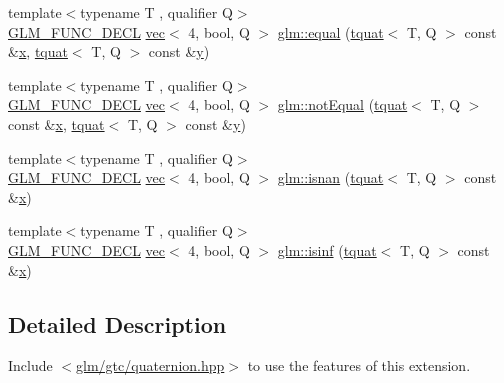 \begin{DoxyCompactItemize}
\item 
{\footnotesize template$<$typename T , qualifier Q$>$ }\\\mbox{\hyperlink{setup_8hpp_ab2d052de21a70539923e9bcbf6e83a51}{G\+L\+M\+\_\+\+F\+U\+N\+C\+\_\+\+D\+E\+CL}} \mbox{\hyperlink{structglm_1_1vec}{vec}}$<$ 4, bool, Q $>$ \mbox{\hyperlink{group__gtc__quaternion_ga22089a76bfb7b45b4c34961bb715e2df}{glm\+::equal}} (\mbox{\hyperlink{structglm_1_1tquat}{tquat}}$<$ T, Q $>$ const \&\mbox{\hyperlink{_s_d_l__opengl_8h_ad0e63d0edcdbd3d79554076bf309fd47}{x}}, \mbox{\hyperlink{structglm_1_1tquat}{tquat}}$<$ T, Q $>$ const \&\mbox{\hyperlink{_s_d_l__opengl_8h_a1675d9d7bb68e1657ff028643b4037e3}{y}})
\item 
{\footnotesize template$<$typename T , qualifier Q$>$ }\\\mbox{\hyperlink{setup_8hpp_ab2d052de21a70539923e9bcbf6e83a51}{G\+L\+M\+\_\+\+F\+U\+N\+C\+\_\+\+D\+E\+CL}} \mbox{\hyperlink{structglm_1_1vec}{vec}}$<$ 4, bool, Q $>$ \mbox{\hyperlink{group__gtc__quaternion_ga9494ec3489041958a240963a8a0ac9a0}{glm\+::not\+Equal}} (\mbox{\hyperlink{structglm_1_1tquat}{tquat}}$<$ T, Q $>$ const \&\mbox{\hyperlink{_s_d_l__opengl_8h_ad0e63d0edcdbd3d79554076bf309fd47}{x}}, \mbox{\hyperlink{structglm_1_1tquat}{tquat}}$<$ T, Q $>$ const \&\mbox{\hyperlink{_s_d_l__opengl_8h_a1675d9d7bb68e1657ff028643b4037e3}{y}})
\item 
{\footnotesize template$<$typename T , qualifier Q$>$ }\\\mbox{\hyperlink{setup_8hpp_ab2d052de21a70539923e9bcbf6e83a51}{G\+L\+M\+\_\+\+F\+U\+N\+C\+\_\+\+D\+E\+CL}} \mbox{\hyperlink{structglm_1_1vec}{vec}}$<$ 4, bool, Q $>$ \mbox{\hyperlink{group__gtc__quaternion_ga31f4378ab97985177e208f4f4f8b1fd3}{glm\+::isnan}} (\mbox{\hyperlink{structglm_1_1tquat}{tquat}}$<$ T, Q $>$ const \&\mbox{\hyperlink{_s_d_l__opengl_8h_ad0e63d0edcdbd3d79554076bf309fd47}{x}})
\item 
{\footnotesize template$<$typename T , qualifier Q$>$ }\\\mbox{\hyperlink{setup_8hpp_ab2d052de21a70539923e9bcbf6e83a51}{G\+L\+M\+\_\+\+F\+U\+N\+C\+\_\+\+D\+E\+CL}} \mbox{\hyperlink{structglm_1_1vec}{vec}}$<$ 4, bool, Q $>$ \mbox{\hyperlink{group__gtc__quaternion_ga139abc0f7f89553e341f8be95bf8d3cb}{glm\+::isinf}} (\mbox{\hyperlink{structglm_1_1tquat}{tquat}}$<$ T, Q $>$ const \&\mbox{\hyperlink{_s_d_l__opengl_8h_ad0e63d0edcdbd3d79554076bf309fd47}{x}})
\end{DoxyCompactItemize}


\subsection{Detailed Description}
Include $<$\mbox{\hyperlink{gtc_2quaternion_8hpp}{glm/gtc/quaternion.\+hpp}}$>$ to use the features of this extension.

